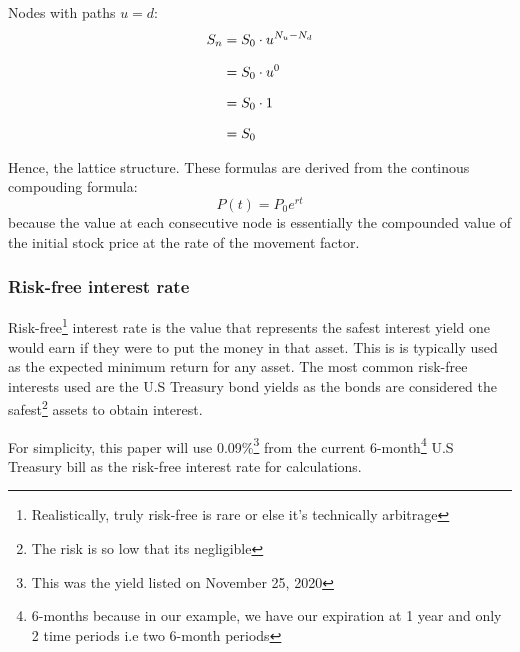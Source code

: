 \documentclass[12pt, letterpaper]{article}\usepackage{float}
\begin{document}
\bigskip

Nodes with paths ${u = d}$:
\begin{equation*}
  \setlength{\jot}{10pt}
  \begin{split}
    {S}_n
    & = {S}_0 \cdot {u}^{N_u-N_d} \\
    & = {S}_0 \cdot {u^0} \\
    & = {S}_0 \cdot 1 \\
    & = {S}_0
  \end{split}
\end{equation*}

\medskip

\noindent Hence, the lattice structure. These formulas are derived from the continous compouding formula\cite{continouscompoundingformulawikipedia, exponentcharacterizationswikipedia}:
\begin{equation*}
  P(t) = {P_0}e^{rt}
\end{equation*}
because the value at each consecutive node is essentially the compounded value of the initial stock price at the rate of the movement factor.


\subsubsection*{Risk-free interest rate}
Risk-free\footnote{Realistically, truly risk-free is rare or else it's technically arbitrage} interest rate is the value that represents the safest interest yield one would earn if they were to put the money in that asset.
This is is typically used as the expected minimum return for any asset. 
The most common risk-free interests used are the U.S Treasury bond yields as the bonds are considered the safest\footnote{The risk is so low that its negligible} assets to obtain interest.

\medskip

For simplicity, this paper will use 0.09\%\footnote{This was the yield listed on November 25, 2020} from the current 6-month\footnote{6-months because in our example, we have our expiration at 1 year and only 2 time periods i.e two 6-month periods} U.S Treasury bill as the risk-free interest rate for calculations.

\pagebreak
\end{document}
